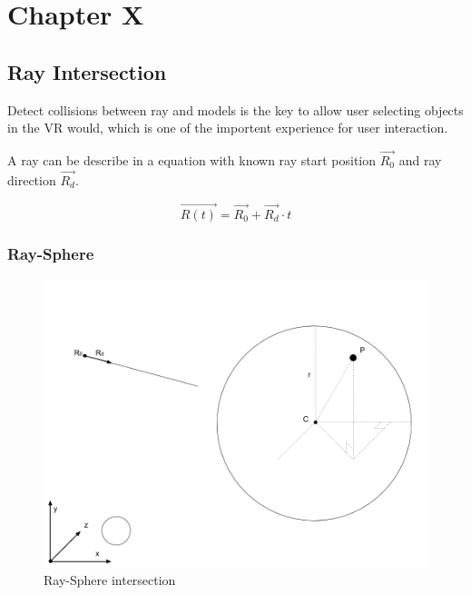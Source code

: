 \label{ChapterX}
\chapter{Chapter X}

\section{Ray Intersection}

Detect collisions between ray and models is the key to allow user selecting objects in the VR would, which is one of the importent experience for user interaction.

A ray can be describe in a equation with known ray start position \emph{$\overrightarrow{R_0}$} and ray direction \emph{$\overrightarrow{R_d}$}.

\begin{equation}\label{equ:ray-t}
\overrightarrow{R(t)} = \overrightarrow{R_0} + \overrightarrow{R_d} \cdot t
\end{equation}

\subsection{Ray-Sphere}

\begin{figure}[H]\label{fig:ray-sphere}
\centering
\includegraphics[width=\linewidth]{Figures/ray-sphere-intersection.png}
\decoRule
\caption[ray-sphere-intersection]{Ray-Sphere intersection}
\end{figure}

